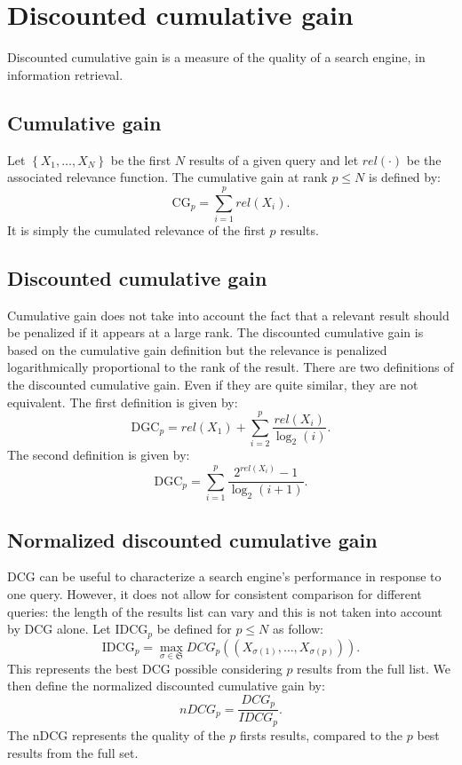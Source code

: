\documentclass[a4paper]{article}
\begin{document}
\section{Discounted cumulative gain}

Discounted cumulative gain is a measure of the quality of a search engine, in
information retrieval.

\subsection{Cumulative gain}
Let $\left\{ X_1, \ldots, X_N \right\}$ be the first $N$ results of a given
query and let $rel(\cdot)$ be the associated relevance function. The cumulative
gain at rank $p \le N$ is defined by:
\[
  \mathrm{CG}_p = \sum_{i = 1}^{p} rel(X_i).
\]
It is simply the cumulated relevance of the first $p$ results.

\subsection{Discounted cumulative gain}
Cumulative gain does not take into account the fact that a relevant result
should be penalized if it appears at a large rank. The discounted cumulative
gain is based on the cumulative gain definition but the relevance is penalized
logarithmically proportional to the rank of the result. There are two
definitions of the discounted cumulative gain. Even if they are quite similar,
they are not equivalent. The first definition is given by:
\[
  \mathrm{DGC}_p = rel(X_1) + \sum_{i = 2}^{p} \frac{rel(X_i)}{\log_2(i)}.
\]
The second definition is given by:
\[
  \mathrm{DGC}_p = \sum_{i = 1}^{p} \frac{2^{rel(X_i)} - 1}{\log_2(i + 1)}.
\]

\subsection{Normalized discounted cumulative gain}
DCG can be useful to characterize a search engine's performance in response to
one query. However, it does not allow for consistent comparison for different
queries: the length of the results list can vary and this is not taken into
account by DCG alone. Let $\mathrm{IDCG}_p$ be defined for $p \le N$ as follow:
\[
  \mathrm{IDCG}_p = \max_{\sigma \in \mathfrak{S}} 
  DCG_p\left( \left( X_{\sigma(1)}, \ldots, X_{\sigma(p)} \right) \right).
\]
This represents the best DCG possible considering $p$ results from the full
list. We then define the normalized discounted cumulative gain by:
\[
  nDCG_p = \frac{DCG_p}{IDCG_p}.
\]
The nDCG represents the quality of the $p$ firsts results, compared to the $p$
best results from the full set.
\end{document}
